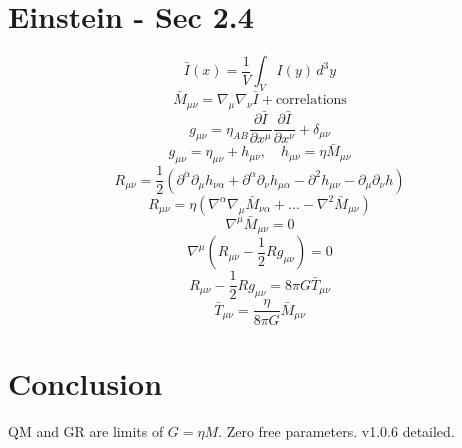 \documentclass[11pt,a4paper]{article}
\begin{document}
\section{Einstein - Sec 2.4}
\begin{equation}
\bar{I}(x) = \frac{1}{V} \int_V I(y) \, d^3y \tag{8}
\end{equation}
\begin{equation}
\bar{M}_{\mu\nu} = \nabla_\mu \nabla_\nu \bar{I} + \text{correlations} \tag{9}
\end{equation}
\begin{equation}
g_{\mu\nu} = \eta_{AB} \frac{\partial \bar{I}}{\partial x^\mu} \frac{\partial \bar{I}}{\partial x^\nu} + \delta_{\mu\nu} \tag{10}
\end{equation}
\begin{equation}
g_{\mu\nu} = \eta_{\mu\nu} + h_{\mu\nu}, \quad h_{\mu\nu} = \eta \bar{M}_{\mu\nu} \tag{11}
\end{equation}
\begin{equation}
R_{\mu\nu} = \frac{1}{2} \left( \partial^\alpha \partial_\mu h_{\nu\alpha} + \partial^\alpha \partial_\nu h_{\mu\alpha} - \partial^2 h_{\mu\nu} - \partial_\mu \partial_\nu h \right) \tag{12}
\end{equation}
\begin{equation}
R_{\mu\nu} = \eta \left( \nabla^\alpha \nabla_\mu \bar{M}_{\nu\alpha} + \dots - \nabla^2 \bar{M}_{\mu\nu} \right) \tag{13}
\end{equation}
\begin{equation}
\nabla^\mu \bar{M}_{\mu\nu} = 0 \tag{14}
\end{equation}
\begin{equation}
\nabla^\mu \left( R_{\mu\nu} - \frac{1}{2} R g_{\mu\nu} \right) = 0 \tag{15}
\end{equation}
\begin{equation}
R_{\mu\nu} - \frac{1}{2} R g_{\mu\nu} = 8\pi G \bar{T}_{\mu\nu} \tag{16}
\end{equation}
\begin{equation}
\bar{T}_{\mu\nu} = \frac{\eta}{8\pi G} \bar{M}_{\mu\nu} \tag{17}
\end{equation}
\section{Conclusion}
QM and GR are limits of $G = \eta M$. Zero free parameters. v1.0.6 detailed.
\end{document}
